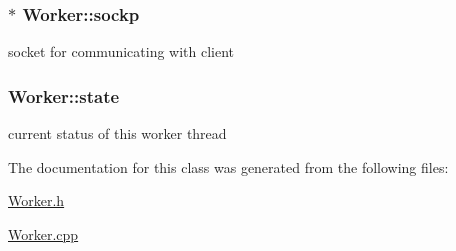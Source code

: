 \subsubsection[{sockp}]{$\ast$ Worker\+::sockp\hspace{0.3cm}{\ttfamily [protected]}}\label{classWorker_a4562eb405aea20c7ac8a552e2075898f}
socket for communicating with client \hypertarget{classWorker_aeb90d4cd08a8a4759749c5388be8c78d}{}
\subsubsection[{state}]{ Worker\+::state\hspace{0.3cm}{\ttfamily [protected]}}\label{classWorker_aeb90d4cd08a8a4759749c5388be8c78d}
current status of this worker thread 

The documentation for this class was generated from the following files\+:\begin{DoxyCompactItemize}
\item 
\hyperlink{Worker_8h}{Worker.\+h}\item 
\hyperlink{Worker_8cpp}{Worker.\+cpp}\end{DoxyCompactItemize}
